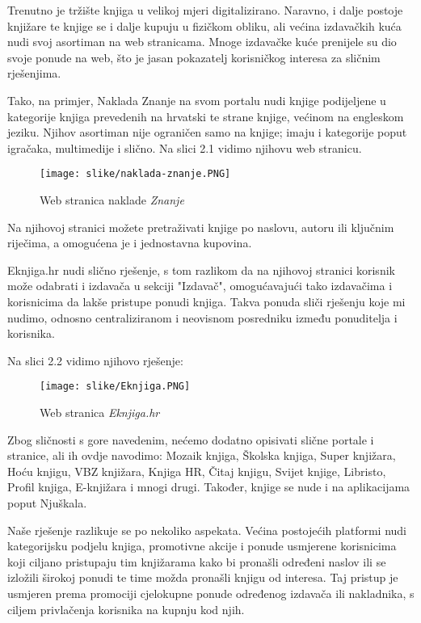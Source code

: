 		Trenutno je tržište knjiga u velikoj mjeri digitalizirano. Naravno, i dalje postoje knjižare te knjige se i dalje kupuju u fizičkom obliku, ali većina izdavačkih kuća nudi svoj asortiman na web stranicama. Mnoge izdavačke kuće prenijele su dio svoje ponude na web, što je jasan pokazatelj korisničkog interesa za sličnim rješenjima.
		
		Tako, na primjer, Naklada Znanje na svom portalu nudi knjige podijeljene u kategorije knjiga prevedenih na hrvatski te strane knjige, većinom na engleskom jeziku. Njihov asortiman nije ograničen samo na knjige; imaju i kategorije poput igračaka, multimedije i slično. Na slici 2.1 vidimo njihovu web stranicu.
		
			\begin{figure}[H]
				\texttt{[image: slike/naklada-znanje.PNG]} %
				\centering
				\caption{Web stranica naklade \textit{Znanje}}
				\label{fig:Naklada Znanje}
			\end{figure}
		
		Na njihovoj stranici možete pretraživati knjige po naslovu, autoru ili ključnim riječima, a omogućena je i jednostavna kupovina.
		
		Eknjiga.hr nudi slično rješenje, s tom razlikom da na njihovoj stranici korisnik može odabrati i izdavača u sekciji "Izdavač", omogućavajući tako izdavačima i korisnicima da lakše pristupe ponudi knjiga. Takva ponuda sliči rješenju koje mi nudimo, odnosno centraliziranom i neovisnom posredniku između ponuditelja i korisnika.
		
		Na slici 2.2 vidimo njihovo rješenje:
		
			\begin{figure}[H]
				\texttt{[image: slike/Eknjiga.PNG]} %
				\centering
				\caption{Web stranica \textit{Eknjiga.hr}}
				\label{fig:Eknjiga}
			\end{figure}
		
		
		Zbog sličnosti s gore navedenim, nećemo dodatno opisivati slične portale i stranice, ali ih ovdje navodimo: Mozaik knjiga, Školska knjiga, Super knjižara, Hoću knjigu, VBZ knjižara, Knjiga HR, Čitaj knjigu, Svijet knjige, Libristo, Profil knjiga, E-knjižara i mnogi drugi. Također, knjige se nude i na aplikacijama poput Njuškala.
		
		Naše rješenje razlikuje se po nekoliko aspekata. Većina postojećih platformi nudi kategorijsku podjelu knjiga, promotivne akcije i ponude usmjerene korisnicima koji ciljano pristupaju tim knjižarama kako bi pronašli određeni naslov ili se izložili širokoj ponudi te time možda pronašli knjigu od interesa. Taj pristup je usmjeren prema promociji cjelokupne ponude određenog izdavača ili nakladnika, s ciljem privlačenja korisnika na kupnju kod njih. 
		
